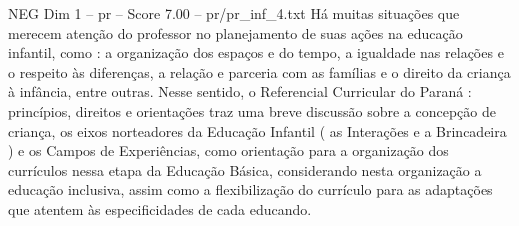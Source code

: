 \begin{textsample}{NEG Dim 1 – pr – Score 7.00 – pr/pr\_inf\_4.txt}
Há muitas situações que merecem atenção do professor no planejamento de suas ações na educação infantil, como : a organização dos espaços e do tempo, a igualdade nas relações e o respeito às diferenças, a relação e parceria com as famílias e o direito da criança à infância, entre outras.
Nesse sentido, o Referencial Curricular do Paraná : princípios, direitos e orientações traz uma breve discussão sobre a concepção de criança, os eixos norteadores da Educação Infantil ( as Interações e a Brincadeira ) e os Campos de Experiências, como orientação para a organização dos currículos nessa etapa da Educação Básica, considerando nesta organização a educação inclusiva, assim como a flexibilização do currículo para as adaptações que atentem às especificidades de cada educando.

\end{textsample}
